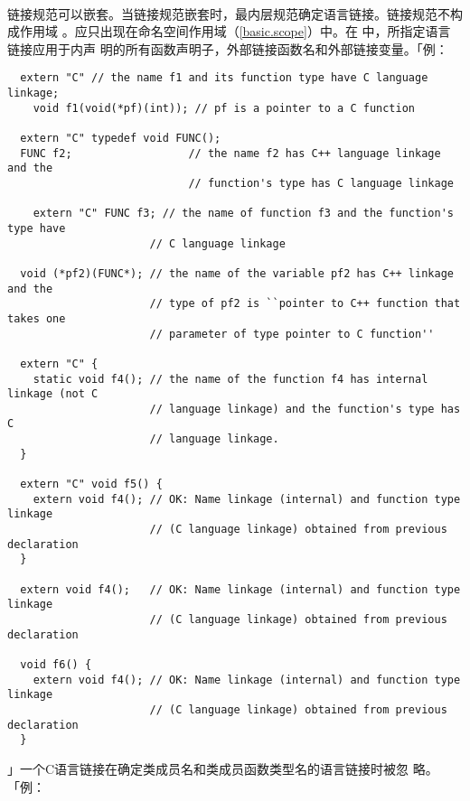 \paragraph{}
链接规范可以嵌套。当链接规范嵌套时，最内层规范确定语言链接。链接规范不构成作用域
。应只出现在命名空间作用域（\ref{basic.scope}）中。在
中，所指定语言链接应用于内声
明的所有函数声明子，外部链接函数名和外部链接变量。「例：
\begin{lstlisting}
  extern "C" // the name f1 and its function type have C language linkage;
    void f1(void(*pf)(int)); // pf is a pointer to a C function

  extern "C" typedef void FUNC();
  FUNC f2;                  // the name f2 has C++ language linkage and the
                            // function's type has C language linkage

	extern "C" FUNC f3; // the name of function f3 and the function's type have
                      // C language linkage

  void (*pf2)(FUNC*); // the name of the variable pf2 has C++ linkage and the
                      // type of pf2 is ``pointer to C++ function that takes one
                      // parameter of type pointer to C function''

  extern "C" {
    static void f4(); // the name of the function f4 has internal linkage (not C
                      // language linkage) and the function's type has C
                      // language linkage.
  }

  extern "C" void f5() {
    extern void f4(); // OK: Name linkage (internal) and function type linkage
                      // (C language linkage) obtained from previous declaration
  }

  extern void f4();   // OK: Name linkage (internal) and function type linkage
                      // (C language linkage) obtained from previous declaration

  void f6() {
    extern void f4(); // OK: Name linkage (internal) and function type linkage
                      // (C language linkage) obtained from previous declaration
  }
\end{lstlisting}」一个C语言链接在确定类成员名和类成员函数类型名的语言链接时被忽
略。「例：
